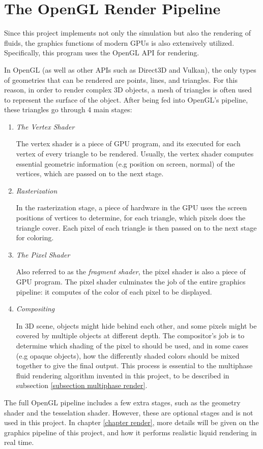 \section{The OpenGL Render Pipeline}
\label{section opengl}

Since this project implements not only the simulation but also the rendering of fluids, the graphics functions of modern GPUs is also extensively utilized. Specifically, this program uses the OpenGL API for rendering.

In OpenGL (as well as other APIs such as Direct3D and Vulkan), the only types of geometries that can be rendered are points, lines, and triangles. For this reason, in order to render complex 3D objects, a mesh of triangles is often used to represent the surface of the object. After being fed into OpenGL's pipeline, these triangles go through 4 main stages:
\begin{enumerate}
    \item 
    \textit{The Vertex Shader}

    The vertex shader is a piece of GPU program, and its executed for each vertex of every triangle to be rendered. Usually, the vertex shader computes essential geometric information (e.g position on screen, normal) of the vertices, which are passed on to the next stage.
    
    \item 
    \textit{Rasterization}

    In the rasterization stage, a piece of hardware in the GPU uses the screen positions of vertices to determine, for each triangle, which pixels does the triangle cover. Each pixel of each triangle is then passed on to the next stage for coloring.
    
    \item
    \textit{The Pixel Shader}

    Also referred to as the \textit{fragment shader}, the pixel shader is also a piece of GPU program. The pixel shader culminates the job of the entire graphics pipeline: it computes of the color of each pixel to be displayed.

    \item 
    \textit{Compositing}

    In 3D scene, objects might hide behind each other, and some pixels might be covered by multiple objects at different depth. The compositor's job is to determine which shading of the pixel to should be used, and in some cases (e.g opaque objects), how the differently shaded colors should be mixed together to give the final output. This process is essential to the multiphase fluid rendering algorithm invented in this project, to be described in subsection \ref{subsection multiphase render}.
    
\end{enumerate}

The full OpenGL pipeline includes a few extra stages, such as the geometry shader and the tesselation shader. However, these are optional stages and is not used in this project. In chapter \ref{chapter render}, more details will be given on the graphics pipeline of this project, and how it performs realistic liquid rendering in real time.